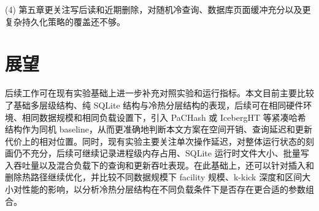 (4) 第五章更关注写后读和近期删除，对随机冷查询、数据库页面缓冲充分以及更复杂持久化策略的覆盖还不够。

\section{展望}

后续工作可在现有实验基础上进一步补充对照实验和运行指标。本文目前主要比较了基础多层级结构、纯 SQLite 结构与冷热分层结构的表现，后续可在相同硬件环境、相同数据规模和相同负载设置下，引入 PaCHash 或 IcebergHT 等紧凑哈希结构作为同机 baseline，从而更准确地判断本文方案在空间开销、查询延迟和更新代价上的相对位置\cite{kurpicz2023pachash,lehmann2026mphsurvey,pibiri2021pthash}。同时，现有实验主要关注单次操作延迟，对整体运行状态的刻画仍不充分，后续可继续记录进程级内存占用、SQLite 运行时文件大小、批量写入吞吐量以及混合负载下的查询和更新吞吐表现\cite{cooper2010ycsb}。在此基础上，还可以针对插入和删除热路径继续优化，并比较不同数据规模下 facility 规模、k-kick 深度和区间大小对性能的影响，以分析冷热分层结构在不同负载条件下是否存在更合适的参数组合。
